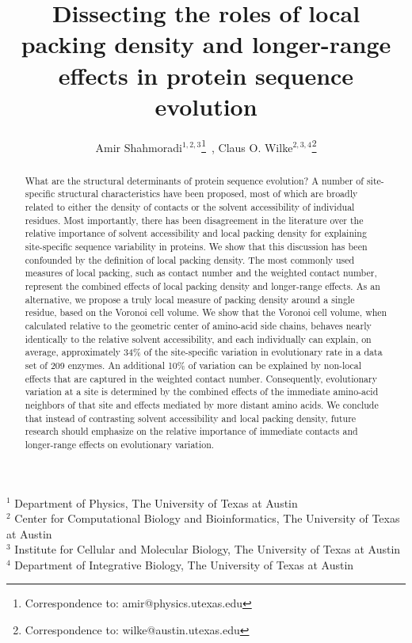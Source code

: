 \documentclass[12pt]{article}
\begin{document}
\title{Dissecting the roles of local packing density and longer-range effects in protein sequence evolution}

\author{Amir Shahmoradi$^{1,2,3}$\footnote{Correspondence to: amir@physics.utexas.edu}~, Claus O. Wilke$^{2,3,4}$\footnote{Correspondence to: wilke@austin.utexas.edu}}
\date{}
\maketitle

\noindent
$^1$ Department of Physics, The University of Texas at Austin\\
$^2$ Center for Computational Biology and Bioinformatics, The University of Texas at Austin\\ 
$^3$ Institute for Cellular and Molecular Biology, The University of Texas at Austin\\
$^4$ Department of Integrative Biology, The University of Texas at Austin\\


\begin{abstract}
What are the structural determinants of protein sequence evolution? A number of site-specific structural characteristics have been proposed, most of which are broadly related to either the density of contacts or the solvent accessibility of individual residues. Most importantly, there has been disagreement in the literature over the relative importance of solvent accessibility and local packing density for explaining site-specific sequence variability in proteins. We show that this discussion has been confounded by the definition of local packing density. The most commonly used measures of local packing, such as contact number and the weighted contact number, represent the combined effects of local packing density and longer-range effects. As an alternative, we propose a truly local measure of packing density around a single residue, based on the Voronoi cell volume. We show that the Voronoi cell volume, when calculated relative to the geometric center of amino-acid side chains, behaves nearly identically to the relative solvent accessibility, and each individually can explain, on average, approximately 34\% of the site-specific variation in evolutionary rate in a data set of 209 enzymes. An additional 10\% of variation can be explained by non-local effects that are captured in the weighted contact number. Consequently, evolutionary variation at a site is determined by the combined effects of the immediate amino-acid neighbors of that site and effects mediated by more distant amino acids. We conclude that instead of contrasting solvent accessibility and local packing density, future research should emphasize on the relative importance of immediate contacts and longer-range effects on evolutionary variation.
\end{abstract}
\end{document}
